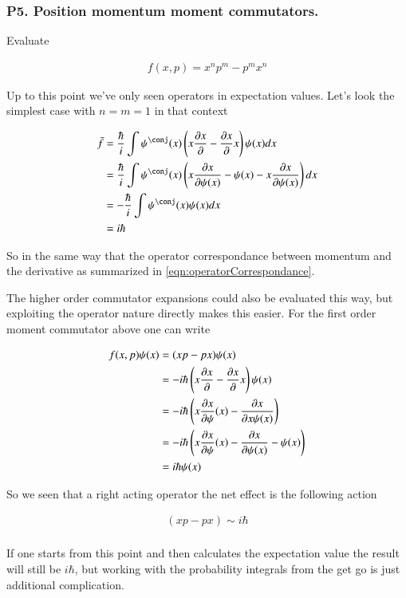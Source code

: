 \documentclass{article}
\begin{document}
\subsubsection{ P5. Position momentum moment commutators. }

Evaluate

\begin{align*}
f(x,p) = x^n p^m - p^m x^n
\end{align*}

Up to this point we've only seen operators in expectation values.  Let's look the simplest case with $n = m = 1$ in that
context

\begin{align*}
\bar{f} 
&= \frac{\hbar}{i} \int \psi^\conj(x) \left(x \PD{x}{} - \PD{x}{} x \right) \psi(x) dx \\
&= \frac{\hbar}{i} \int \psi^\conj(x) \left(x \PD{x}{\psi(x)} - \psi(x) - x \PD{x}{\psi(x)} \right) dx \\
&= -\frac{\hbar}{i} \int \psi^\conj(x) \psi(x) dx \\
&= {i\hbar}
\end{align*}

So in the same way that the operator correspondance between momentum and the derivative as summarized in 
\ref{eqn:operatorCorrespondance}.

The higher order commutator expansions could also be evaluated this way, but exploiting the operator nature directly 
makes this easier.  For the first order moment commutator above one can write

\begin{align*}
f(x,p) \psi(x) 
&= (x p - p x) \psi(x) \\
&= -i \hbar \left(x \frac{\partial{x}}{\partial {}} - \frac{\partial{x}}{\partial {}} x\right) \psi(x) \\
&= -i \hbar \left(x \frac{\partial{x}}{\partial {\psi}}(x) - \frac{\partial{x}}{\partial {x \psi(x)}} \right) \\
&= -i \hbar \left(x \frac{\partial{x}}{\partial {\psi}}(x) - \frac{\partial{x}}{\partial {\psi(x)}} -\psi(x) \right) \\
&= i \hbar \psi(x) \\
\end{align*}

So we seen that a right acting operator the net effect is the following action

\begin{align*}
(x p - p x) \sim i \hbar \\
\end{align*}

If one starts from this point and then calculates the expectation value the result will still be $i \hbar$, but working
with the probability integrals from the get go is just additional complication.
\end{document}
